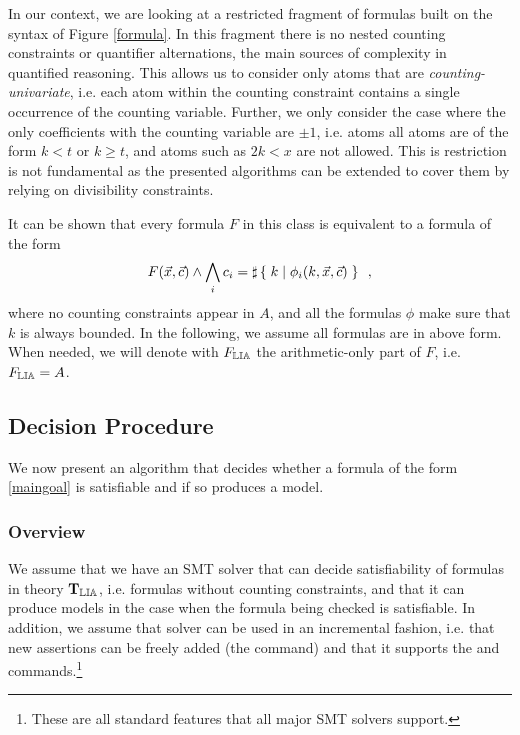 In our context, we are looking at a restricted fragment of formulas
built on the syntax of Figure \ref{formula}. In this fragment there is
no nested counting constraints or quantifier alternations, the main
sources of complexity in quantified reasoning. This allows us to
consider only atoms that are \emph{counting-univariate}, i.e. each
atom within the counting constraint contains a single occurrence of
the counting variable. Further, we only consider the case where the
only coefficients with the counting variable are $\pm 1$, i.e. atoms
all atoms are of the form $k < t$ or $k \geq t$, and atoms such as $2k <
x$ are not allowed. This is restriction is not fundamental as the
presented algorithms can be extended to cover them by relying on
divisibility constraints.

It can be shown that every formula $F$ in this class is equivalent to a
formula of the form
\begin{equation}
\label{maingoal}
F(\vec{x}, \vec{c}) \land \bigwedge_i c_i = \sharp\left\lbrace\;k\;|\;\phi_i(k, \vec{x}, \vec{c})\;\right\rbrace\enspace,
\end{equation}
where no counting constraints appear in $A$, and all the formulas $\phi$
make sure that $k$ is always bounded. In the following, we assume all
formulas are in above form. When needed, we will denote with $F_{\mathbb{LIA}}$
the arithmetic-only part of $F$, i.e. $F_{\mathbb{LIA}} = A$.

\subsection{Decision Procedure}

We now present an algorithm that decides whether a formula of the form
\ref{maingoal} is satisfiable and if so produces a model.

\subsubsection{Overview}

We assume that we have an SMT solver \solver that can decide
satisfiability of formulas in theory $\operatorname{\mathbf{T}_{\mathbb{LIA}}}$, i.e. formulas without
counting constraints, and that it can produce models in the case when
the formula being checked is satisfiable. In addition, we assume that
solver \solver can be used in an incremental fashion, i.e. that new
assertions can be freely added (the \assert command) and that it
supports the \push and \pop commands.\footnote{These are all standard
features that all major SMT solvers support.}

